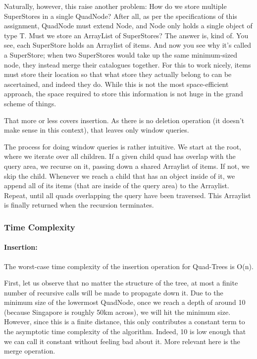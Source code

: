 \documentclass[12pt]{article}
\begin{document}
{Naturally, however, this raise another problem: How do we store multiple SuperStores in a single QuadNode? After all, as per the specifications of this assignment, QuadNode must extend Node, and Node only holds a single object of type T. Must we store an ArrayList of SuperStores? The answer is, kind of. You see, each SuperStore holds an Arraylist of items. And now you see why it's called a SuperStore; when two SuperStores would take up the same minimum-sized node, they instead merge their catalogues together. For this to work nicely, items must store their location so that what store they actually belong to can be ascertained, and indeed they do. While this is not the most space-efficient approach, the space required to store this information is not huge in the grand scheme of things.

That more or less covers insertion. As there is no deletion operation (it doesn't make sense in this context), that leaves only window queries.

The process for doing window queries is rather intuitive. We start at the root, where we iterate over all children. If a given child quad has overlap with the query area, we recurse on it, passing down a shared Arraylist of items. If not, we skip the child. Whenever we reach a child that has an object inside of it, we append all of its items (that are inside of the query area) to the Arraylist. Repeat, until all quads overlapping the query have been traversed. This Arraylist is finally returned when the recursion terminates.

\subsubsection{Time Complexity}

\paragraph{Insertion:} 

The worst-case time complexity of the insertion operation for Quad-Trees is O(n).

First, let us observe that no matter the structure of the tree, at most a finite number of recursive calls will be made to propagate down it. Due to the minimum size of the lowermost QuadNode, once we reach a depth of around 10 (because Singapore is roughly 50km across), we will hit the minimum size. However, since this is a finite distance, this only contributes a constant term to the asymptotic time complexity of the algorithm. Indeed, 10 is low enough that we can call it constant without feeling bad about it. More relevant here is the merge operation.

}
\end{document}
